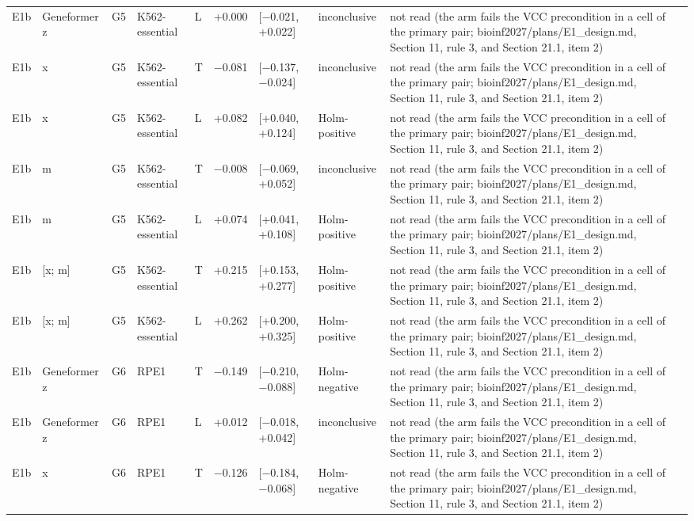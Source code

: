 \begin{tabular}{llllllllll}
E1b & Geneformer z & G5 & K562-essential & L & +0.000 & [−0.021, +0.022] & inconclusive & not read (the arm fails the VCC precondition in a cell of the primary pair; bioinf2027/plans/E1\_design.md, Section 11, rule 3, and Section 21.1, item 2) &  \\
E1b & x & G5 & K562-essential & T & −0.081 & [−0.137, −0.024] & inconclusive & not read (the arm fails the VCC precondition in a cell of the primary pair; bioinf2027/plans/E1\_design.md, Section 11, rule 3, and Section 21.1, item 2) &  \\
E1b & x & G5 & K562-essential & L & +0.082 & [+0.040, +0.124] & Holm-positive & not read (the arm fails the VCC precondition in a cell of the primary pair; bioinf2027/plans/E1\_design.md, Section 11, rule 3, and Section 21.1, item 2) &  \\
E1b & m & G5 & K562-essential & T & −0.008 & [−0.069, +0.052] & inconclusive & not read (the arm fails the VCC precondition in a cell of the primary pair; bioinf2027/plans/E1\_design.md, Section 11, rule 3, and Section 21.1, item 2) &  \\
E1b & m & G5 & K562-essential & L & +0.074 & [+0.041, +0.108] & Holm-positive & not read (the arm fails the VCC precondition in a cell of the primary pair; bioinf2027/plans/E1\_design.md, Section 11, rule 3, and Section 21.1, item 2) &  \\
E1b & [x; m] & G5 & K562-essential & T & +0.215 & [+0.153, +0.277] & Holm-positive & not read (the arm fails the VCC precondition in a cell of the primary pair; bioinf2027/plans/E1\_design.md, Section 11, rule 3, and Section 21.1, item 2) &  \\
E1b & [x; m] & G5 & K562-essential & L & +0.262 & [+0.200, +0.325] & Holm-positive & not read (the arm fails the VCC precondition in a cell of the primary pair; bioinf2027/plans/E1\_design.md, Section 11, rule 3, and Section 21.1, item 2) &  \\
E1b & Geneformer z & G6 & RPE1 & T & −0.149 & [−0.210, −0.088] & Holm-negative & not read (the arm fails the VCC precondition in a cell of the primary pair; bioinf2027/plans/E1\_design.md, Section 11, rule 3, and Section 21.1, item 2) &  \\
E1b & Geneformer z & G6 & RPE1 & L & +0.012 & [−0.018, +0.042] & inconclusive & not read (the arm fails the VCC precondition in a cell of the primary pair; bioinf2027/plans/E1\_design.md, Section 11, rule 3, and Section 21.1, item 2) &  \\
E1b & x & G6 & RPE1 & T & −0.126 & [−0.184, −0.068] & Holm-negative & not read (the arm fails the VCC precondition in a cell of the primary pair; bioinf2027/plans/E1\_design.md, Section 11, rule 3, and Section 21.1, item 2) &  \\

\end{tabular}

